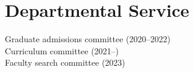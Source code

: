 
\section{\sc Departmental Service}
Graduate admissions committee (2020--2022)\\
Curriculum committee (2021--)\\
Faculty search committee (2023)\\
